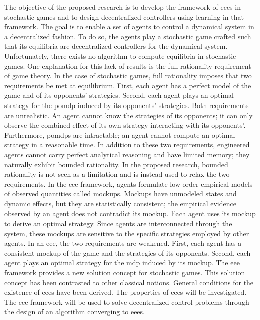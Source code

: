 The objective of the proposed research is to develop the framework of \acp{eee} in stochastic games and to design decentralized controllers using learning in that framework.
The goal is to enable a set of agents to control a dynamical system in a decentralized fashion.
To do so, the agents play a stochastic game crafted such that its equilibria are decentralized controllers for the dynamical system.
Unfortunately, there exists no algorithm to compute equilibria in stochastic games.
One explanation for this lack of results is the full-rationality requirement of game theory.
In the case of stochastic games, full rationality imposes that two requirements be met at equilibrium.
First, each agent has a perfect model of the game and of its opponents' strategies.
Second, each agent plays an optimal strategy for the \ac{pomdp} induced by its opponents' strategies.
Both requirements are unrealistic.
An agent cannot know the strategies of its opponents; it can only observe the combined effect of its own strategy interacting with its opponents'.
Furthermore, \acp{pomdp} are intractable; an agent cannot compute an optimal strategy in a reasonable time.
In addition to these two requirements, engineered agents cannot carry perfect analytical reasoning and have limited memory; they naturally exhibit bounded rationality.
In the proposed research, bounded rationality is not seen as a limitation and is instead used to relax the two requirements.
In the \ac{eee} framework, agents formulate low-order empirical models of observed quantities called mockups.
Mockups have unmodeled states and dynamic effects, but they are statistically consistent; the empirical evidence observed by an agent does not contradict its mockup.
Each agent uses its mockup to derive an optimal strategy.
Since agents are interconnected through the system, these mockups are sensitive to the specific strategies employed by other agents.
In an \ac{eee}, the two requirements are weakened.
First, each agent has a consistent mockup of the game and the strategies of its opponents.
Second, each agent plays an optimal strategy for the \ac{mdp} induced by its mockup.
The \ac{eee} framework provides a new solution concept for stochastic games.
This solution concept has been contrasted to other classical notions.
General conditions for the existence of \acp{eee} have been derived.
The properties of \acp{eee} will be investigated.
The \ac{eee} framework will be used to solve decentralized control problems through the design of an algorithm converging to \acp{eee}.
